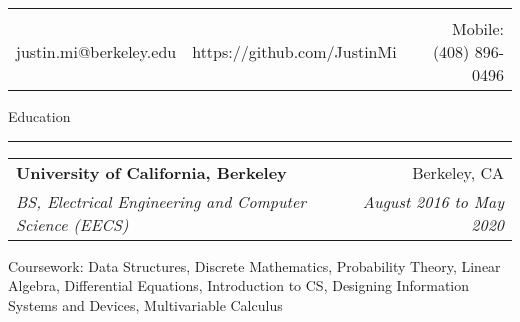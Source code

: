 \documentclass[11pt,letterpaper]{article}
\makeatletter
\newenvironment{topic}[1]
    {
    \large #1
    \vspace*{0.03in}
    \hrule 
    \vspace*{0.05in}
    }
    {}
\newenvironment{event}
    {
    \begin{tabular*}{\textwidth}{l@{\extracolsep{\fill}}r}
    }
    {
    \end{tabular*}
    }
\newenvironment{detail}
    {
    \normalsize
    }
    {
    \vspace*{0.02in}
    }
\newenvironment{head}
    {
    \begin{center}
    \begin{tabular*}{\textwidth}{@{\extracolsep{\fill}} l c r}
    }
    {
    \hline
    \hline
    \end{tabular*}
    \end{center}
    }
\makeatother
\begin{document}
    \begin{head}
                           & \huge{\textbf{\sc{Justin Mi}}} \\
    justin.mi@berkeley.edu & https://github.com/JustinMi & Mobile: (408) 896-0496 \\
    \end{head}





    \begin{topic}{Education}
        \begin{event}
            \textbf{University of California, Berkeley} & Berkeley, CA \\
            \emph{BS, Electrical Engineering and Computer Science (EECS)} & \emph{August 2016 to May 2020}        
        \end{event}
            \begin{detail}
                Coursework: Data Structures, Discrete Mathematics, Probability Theory,  Linear Algebra, Differential Equations, Introduction to CS, Designing Information Systems and Devices, Multivariable Calculus            
            \end{detail}
    \end{topic} \vspace*{0.1in}
\end{document}
